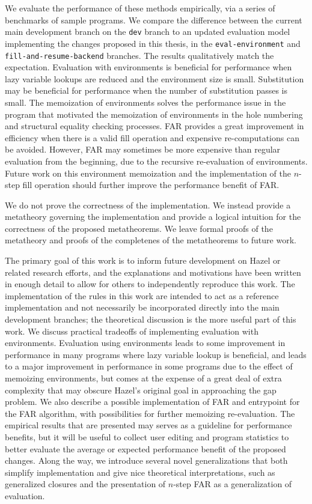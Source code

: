 We evaluate the performance of these methods empirically, via a series of benchmarks of sample programs. We compare the difference between the current main development branch on the \texttt{dev} branch to an updated evaluation model implementing the changes proposed in this thesis, in the \texttt{eval-environment} and \texttt{fill-and-resume-backend} branches. The results qualitatively match the expectation. Evaluation with environments is beneficial for performance when lazy variable lookups are reduced and the environment size is small. Substitution may be beneficial for performance when the number of substitution passes is small. The memoization of environments solves the performance issue in the program that motivated the memoization of environments in the hole numbering and structural equality checking processes. FAR provides a great improvement in efficiency when there is a valid fill operation and expensive re-computations can be avoided. However, FAR may sometimes be more expensive than regular evaluation from the beginning, due to the recursive re-evaluation of environments. Future work on this environment memoization and the implementation of the $n$-step fill operation should further improve the performance benefit of FAR.

We do not prove the correctness of the implementation. We instead provide a metatheory governing the implementation and provide a logical intuition for the correctness of the proposed metatheorems. We leave formal proofs of the metatheory and proofs of the completenes of the metatheorems to future work.

The primary goal of this work is to inform future development on Hazel or related research efforts, and the explanations and motivations have been written in enough detail to allow for others to independently reproduce this work. The implementation of the rules in this work are intended to act as a reference implementation and not necessarily be incorporated directly into the main development branches; the theoretical discussion is the more useful part of this work. We discuss practical tradeoffs of implementing evaluation with environments. Evaluation using environments leads to some improvement in performance in many programs where lazy variable lookup is beneficial, and leads to a major improvement in performance in some programs due to the effect of memoizing environments, but comes at the expense of a great deal of extra complexity that may obscure Hazel's original goal in approaching the gap problem. We also describe a possible implementation of FAR and entrypoint for the FAR algorithm, with possibilities for further memoizing re-evaluation. The empirical results that are presented may serves as a guideline for performance benefits, but it will be useful to collect user editing and program statistics to better evaluate the average or expected performance benefit of the proposed changes. Along the way, we introduce several novel generalizations that both simplify implementation and give nice theoretical interpretations, such as generalized closures and the presentation of $n$-step FAR as a generalization of evaluation.

